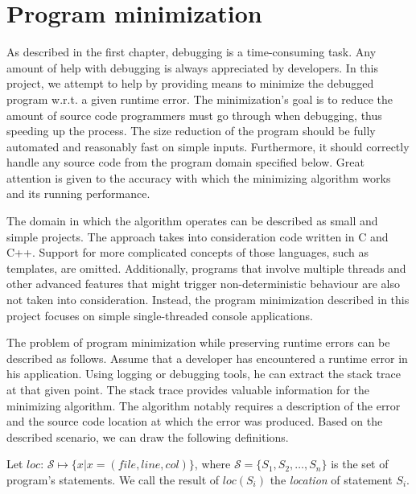 \chapter{Program minimization}\label{chap:minimization}

As described in the first chapter, debugging is a time-consuming task.
Any amount of help with debugging is always appreciated by developers.
In this project, we attempt to help by providing means to minimize the 
debugged program w.r.t. a given runtime error.
The minimization's goal is to reduce the amount of source code programmers 
must go through when debugging, thus speeding up the process.
The size reduction of the program should be fully automated and reasonably 
fast on simple inputs.
Furthermore, it should correctly handle any source code from the program 
domain specified below.
Great attention is given to the accuracy with which the minimizing algorithm 
works and its running performance.


The domain in which the algorithm operates can be described as small and 
simple projects.
The approach takes into consideration code written in C and C++.
Support for more complicated concepts of those languages, such as templates,
are omitted.
Additionally, programs that involve multiple threads and other advanced
features that might trigger non-deterministic behaviour are also not taken 
into consideration.
Instead, the program minimization described in this project focuses 
on simple single-threaded console applications.

The problem of program minimization while preserving runtime errors can be 
described as follows.
Assume that a developer has encountered a runtime error in his application.
Using logging or debugging tools, he can extract the stack trace at that 
given point.
The stack trace provides valuable information for the minimizing algorithm.
The algorithm notably requires a description of the error and the source code 
location at which the error was produced.
Based on the described scenario, we can draw the following definitions.

\begin{defn}[Location]\label{def04:1}
  Let $loc$: $\mathcal{S} \mapsto \{x | x = (file, line, col)\}$, 
  where $\mathcal{S} = \{S_1, S_2, \ldots, S_n\}$ 
  is the set of program's statements.
  We call the result of $loc(S_i)$ the \emph{location} of statement $S_i$.
\end{defn}


